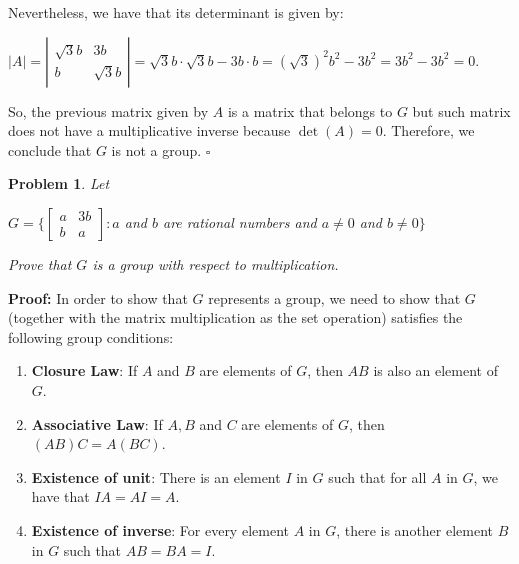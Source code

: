 \documentclass[a4paper,openany,11pt]{book}
\newtheorem{Prob}{Problem}
\begin{document}
Nevertheless, we have that its determinant is given by:

\begin{center}
	$\left|A\right| = \left|\begin{array}{cc}
		\sqrt{3}b & 3b\\
		b & \sqrt{3}b
	\end{array}\right| = \sqrt{3}b\cdot\sqrt{3}b - 3b\cdot b = (\sqrt{3})^{2}b^{2} - 3b^{2} = 3b^{2} - 3b^{2} = 0$.
\end{center}

So, the previous matrix given by $A$ is a matrix that belongs to $G$ but such matrix does not have a multiplicative inverse because $\det(A) = 0$. Therefore, we conclude that $G$ is not a group. \hspace{0.1cm} $\square$

\begin{Prob}
	Let
	
	\begin{center}
		$G = \biggl\{\left[\begin{array}{cc}
		a & 3b\\
		b & a
		\end{array}\right] : a$ and $b$ are rational numbers and $a \neq 0$ and $b \neq 0\biggr\} $
	\end{center}
	
	Prove that $G$ is a group with respect to multiplication.
\end{Prob}

\textbf{Proof:} In order to show that $G$ represents a group, we need to show that $G$ (together with the matrix multiplication as the set operation) satisfies the following group conditions:

\begin{enumerate}
	\item \textbf{Closure Law}: If $A$ and $B$ are elements of $G$, then $AB$ is also an element of $G$. 
	
	\item \textbf{Associative Law}: If $A, B$ and $C$ are elements of $G$, then $(AB)C = A(BC)$.
	
	\item \textbf{Existence of unit}: There is an element $I$ in $G$ such that for all $A$ in $G$, we have that $IA = AI = A$.
	
	\item \textbf{Existence of inverse}: For every element $A$ in $G$, there is another element $B$ in $G$ such that $AB = BA = I$.
\end{enumerate}
\end{document}
